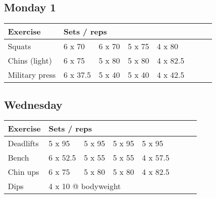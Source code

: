 \documentclass[12pt, a4paper]{article}%
\begin{document}
  \subsection*{\hspace{0.5em} Monday 1 }


  \begin{tabular}{l|lllllll}
  \hspace{0.75em} \textbf{Exercise} & \multicolumn{ 7 }{l}{ \textbf{Sets / reps} } \\ \hline

            \hspace{0.75em} Squats
            & 6 x 70
            & 6 x 70
            & 5 x 75
            & 4 x 80
            & 
            & 
            & 
            \\


            \hspace{0.75em} Chins (light)
            & 6 x 75
            & 5 x 80
            & 5 x 80
            & 4 x 82.5
            & 
            & 
            & 
            \\


            \hspace{0.75em} Military press
            & 6 x 37.5
            & 5 x 40
            & 5 x 40
            & 4 x 42.5
            & 
            & 
            & 
            \\


  \end{tabular}

  \subsection*{\hspace{0.5em} Wednesday }


  \begin{tabular}{l|lllllll}
  \hspace{0.75em} \textbf{Exercise} & \multicolumn{ 7 }{l}{ \textbf{Sets / reps} } \\ \hline

            \hspace{0.75em} Deadlifts
            & 5 x 95
            & 5 x 95
            & 5 x 95
            & 5 x 95
            & 
            & 
            & 
            \\


            \hspace{0.75em} Bench
            & 6 x 52.5
            & 5 x 55
            & 5 x 55
            & 4 x 57.5
            & 
            & 
            & 
            \\


            \hspace{0.75em} Chin ups
            & 6 x 75
            & 5 x 80
            & 5 x 80
            & 4 x 82.5
            & 
            & 
            & 
            \\


   \hspace{0.75em} Dips &  \multicolumn{ 7 }{l}{ 4 x 10 @ bodyweight } \\
  \end{tabular}
\end{document}
